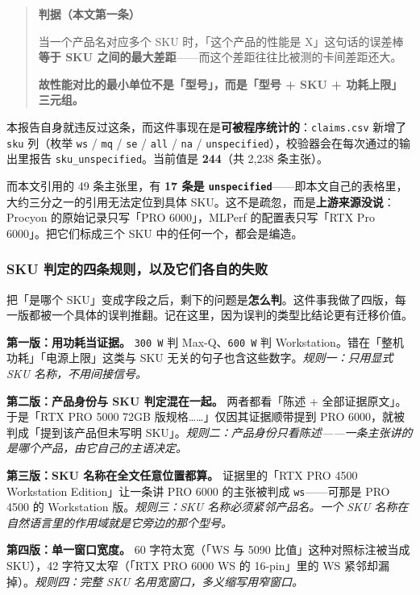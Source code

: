 \begin{quote}\small
\textbf{ 判据（本文第一条）}

当一个产品名对应多个 SKU 时，「这个产品的性能是 X」这句话的误差棒\textbf{等于 SKU 之间的最大差距}——而这个差距往往比被测的卡间差距还大。

\textbf{故性能对比的最小单位不是「型号」，而是「型号 + SKU + 功耗上限」三元组。}

\end{quote}

本报告自身就违反过这条，而这件事现在是\textbf{可被程序统计的}：\texttt{claims.csv} 新增了 \texttt{sku} 列（枚举 \texttt{ws} / \texttt{mq} / \texttt{se} / \texttt{all} / \texttt{na} / \texttt{unspecified}），校验器会在每次通过的输出里报告 \texttt{sku\_unspecified}。当前值是 \textbf{244}（共 2,238 条主张）。


而本文引用的 49 条主张里，有 \textbf{17 条是 \texttt{unspecified}}——即本文自己的表格里，大约三分之一的引用无法定位到具体 SKU。这不是疏忽，而是\textbf{上游来源没说}：Procyon 的原始记录只写「PRO 6000」，MLPerf 的配置表只写「RTX Pro 6000」。把它们标成三个 SKU 中的任何一个，都会是编造。


\subsubsection{SKU 判定的四条规则，以及它们各自的失败}

把「是哪个 SKU」变成字段之后，剩下的问题是\textbf{怎么判}。这件事我做了四版，每一版都被一个具体的误判推翻。记在这里，因为误判的类型比结论更有迁移价值。


\textbf{第一版：用功耗当证据。} \texttt{300 W} 判 Max-Q、\texttt{600 W} 判 Workstation。错在「整机功耗」「电源上限」这类与 SKU 无关的句子也含这些数字。\textit{规则一：只用显式 SKU 名称，不用间接信号。}


\textbf{第二版：产品身份与 SKU 判定混在一起。} 两者都看「陈述 + 全部证据原文」。于是「RTX PRO 5000 72GB 版规格……」仅因其证据顺带提到 PRO 6000，就被判成「提到该产品但未写明 SKU」。\textit{规则二：产品身份只看陈述——一条主张讲的是哪个产品，由它自己的主语决定。}


\textbf{第三版：SKU 名称在全文任意位置都算。} 证据里的「RTX PRO 4500 Workstation Edition」让一条讲 PRO 6000 的主张被判成 \texttt{ws}——可那是 PRO 4500 的 Workstation 版。\textit{规则三：SKU 名称必须紧邻产品名。一个 SKU 名称在自然语言里的作用域就是它旁边的那个型号。}


\textbf{第四版：单一窗口宽度。} 60 字符太宽（「WS 与 5090 比值」这种对照标注被当成 SKU），42 字符又太窄（「RTX PRO 6000 WS 的 16-pin」里的 WS 紧邻却漏掉）。\textit{规则四：完整 SKU 名用宽窗口，多义缩写用窄窗口。}


